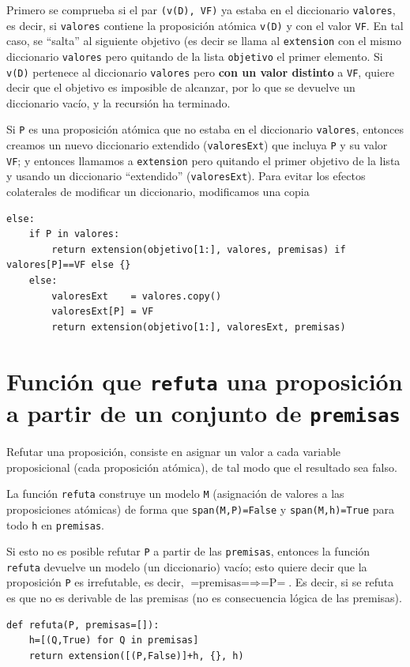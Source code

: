 \documentclass[10pt,a4paper]{report}
\begin{document}
Primero se comprueba si el par \texttt{(v(D), VF)} ya estaba en el diccionario \texttt{valores}, es decir, si \texttt{valores} contiene la proposición atómica \texttt{v(D)} y con el valor \texttt{VF}. 
En tal caso, se ``salta'' al siguiente objetivo (es decir se llama al \texttt{extension} con el mismo diccionario \texttt{valores} pero quitando de la lista \texttt{objetivo} el primer elemento. 
Si \texttt{v(D)} pertenece al diccionario \texttt{valores} pero \textbf{con un valor distinto} a \texttt{VF}, quiere decir que el objetivo es imposible de alcanzar, por lo que se devuelve un diccionario vacío, y la recursión ha terminado.

Si \texttt{P} es una proposición atómica que no estaba en el diccionario \texttt{valores}, entonces creamos un nuevo diccionario extendido (\texttt{valoresExt}) que incluya \texttt{P} y su valor \texttt{VF}; y entonces llamamos a \texttt{extension} pero quitando el primer objetivo de la lista y usando un diccionario ``extendido'' (\texttt{valoresExt}). 
Para evitar los efectos colaterales de modificar un diccionario, modificamos una copia

\begin{verbatim}
else:      
    if P in valores:
        return extension(objetivo[1:], valores, premisas) if valores[P]==VF else {}
    else:
        valoresExt    = valores.copy() 
        valoresExt[P] = VF          
        return extension(objetivo[1:], valoresExt, premisas)
\end{verbatim}
\chapter{Función que \texttt{refuta} una proposición a partir de un conjunto de \texttt{premisas}}
\label{sec:orgde36f73}

Refutar una proposición, consiste en asignar un valor a cada variable proposicional (cada proposición atómica), de tal modo que el resultado sea falso.

La función \texttt{refuta} construye un modelo \texttt{M} (asignación de valores a las proposiciones atómicas) de forma que \texttt{span(M,P)=False} y \texttt{span(M,h)=True} para todo \texttt{h} en \texttt{premisas}.

Si esto no es posible refutar \texttt{P} a partir de las \texttt{premisas}, entonces la función \texttt{refuta} devuelve un modelo (un diccionario) vacío; esto quiere decir que la proposición \texttt{P} es irrefutable, es decir, \(\text{=premisas=}\Rightarrow\text{=P=}\).  
Es decir, si se refuta es que no es derivable de las premisas (no es consecuencia lógica de las premisas).
\begin{verbatim}
def refuta(P, premisas=[]):
    h=[(Q,True) for Q in premisas]
    return extension([(P,False)]+h, {}, h) 

\end{verbatim}
\end{document}
